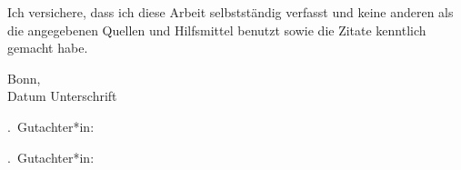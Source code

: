\documentclass[
    paper=a4,
    fontsize=12pt,
    ngerman,
    english
]{scrreprt}
\begin{document}
\noindent
Ich versichere, dass ich diese Arbeit selbstständig verfasst und keine anderen
als die angegebenen Quellen und Hilfsmittel benutzt sowie die Zitate kenntlich
gemacht habe.

\vspace{2.8cm}

\noindent
Bonn, \dotfill \hspace{4cm} \dotfill\\
\hspace*{2.3cm} Datum \hspace{6.8cm} Unterschrift

\vspace{2.2cm}

.\ Gutachter*in:\ \thesisrefereeone

\vspace{0.8cm}

.\ Gutachter*in:\ \thesisrefereetwo

\clearpage

\setcounter{page}{1}

\tableofcontents
\clearpage
{}
\setcounter{page}{1}


% 
% 
% 
% 
% 
% 
% 
% 

\appendix
\printbibliography
\listoffigures{}
\listoftables{}
% 
\end{document}
